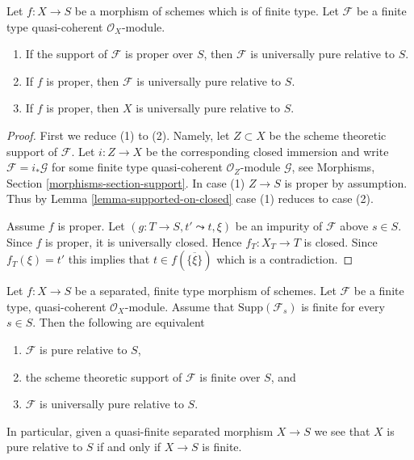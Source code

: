 \begin{lemma}
\label{lemma-proper-pure}
Let $f : X \to S$ be a morphism of schemes which is of finite type.
Let $\mathcal{F}$ be a finite type quasi-coherent $\mathcal{O}_X$-module.
\begin{enumerate}
\item If the support of $\mathcal{F}$ is proper over $S$, then
$\mathcal{F}$ is universally pure relative to $S$.
\item If $f$ is proper, then
$\mathcal{F}$ is universally pure relative to $S$.
\item If $f$ is proper, then $X$ is universally pure relative to $S$.
\end{enumerate}
\end{lemma}

\begin{proof}
First we reduce (1) to (2). Namely, let $Z \subset X$ be the
scheme theoretic support of $\mathcal{F}$. Let $i : Z \to X$
be the corresponding closed immersion and write
$\mathcal{F} = i_*\mathcal{G}$ for some finite type quasi-coherent
$\mathcal{O}_Z$-module $\mathcal{G}$, see
Morphisms, Section \ref{morphisms-section-support}.
In case (1) $Z \to S$ is proper by assumption.
Thus by Lemma \ref{lemma-supported-on-closed} case (1) reduces to case (2).

\medskip\noindent
Assume $f$ is proper.
Let $(g : T \to S, t' \leadsto t, \xi)$ be an impurity of $\mathcal{F}$
above $s \in S$. Since $f$ is proper, it is universally closed. Hence
$f_T : X_T \to T$ is closed. Since $f_T(\xi) = t'$ this implies that
$t \in f(\overline{\{\xi\}})$ which is a contradiction.
\end{proof}

\begin{lemma}
\label{lemma-quasi-finite-pure}
Let $f : X \to S$ be a separated, finite type morphism of schemes.
Let $\mathcal{F}$ be a finite type, quasi-coherent $\mathcal{O}_X$-module.
Assume that $\text{Supp}(\mathcal{F}_s)$ is finite for every $s \in S$.
Then the following are equivalent
\begin{enumerate}
\item $\mathcal{F}$ is pure relative to $S$,
\item the scheme theoretic support of $\mathcal{F}$ is finite over $S$, and
\item $\mathcal{F}$ is universally pure relative to $S$.
\end{enumerate}
In particular, given a quasi-finite separated morphism $X \to S$ we see
that $X$ is pure relative to $S$ if and only if $X \to S$ is finite.
\end{lemma}

